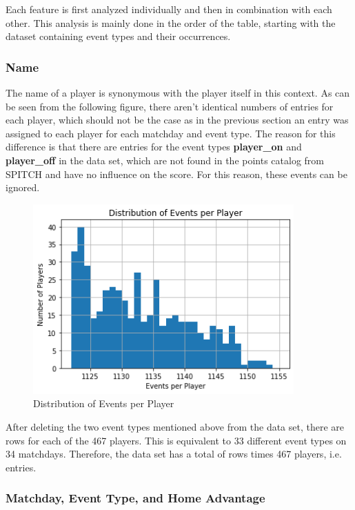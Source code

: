 Each feature is first analyzed individually and then in combination with each other. This analysis is mainly done in the order of the table, starting with the dataset containing event types and their occurrences.

\subsubsection{Name}

The name of a player is synonymous with the player itself in this context. As can be seen from the following figure, there aren't identical numbers of entries for each player, which should not be the case as in the previous section an entry was assigned to each player for each matchday and event type. The reason for this difference is that there are entries for the event types \textbf{player\_on} and \textbf{player\_off} in the data set, which are not found in the points catalog from SPITCH and have no influence on the score. For this reason, these events can be ignored.

\begin{figure}[H]
    \centering
    \label{fig:distribution_of_events_per_player}
    \includegraphics[width=10cm]{chapter/4_implementation/section/2_data/section/figures/distribution_of_events_per_player.png}
    \captionsetup{justification=centering}
    \caption{Distribution of Events per Player}
\end{figure}

After deleting the two event types mentioned above from the data set, there are  rows for each of the 467 players. This is equivalent to 33 different event types on 34 matchdays. Therefore, the data set has a total of  rows times 467 players, i.e.  entries. 

 \clearpage \subsubsection{Matchday, Event Type, and Home Advantage}

